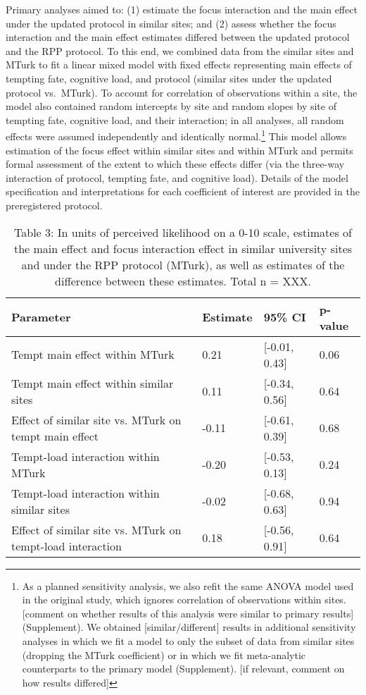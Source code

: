 \documentclass[english,floatsintext,man]{apa6}
\theoremstyle{definition}
\theoremstyle{definition}
\theoremstyle{definition}
\theoremstyle{remark}
\begin{document}
Primary analyses aimed to: (1) estimate the focus interaction and the
main effect under the updated protocol in similar sites; and (2) assess
whether the focus interaction and the main effect estimates differed
between the updated protocol and the RPP protocol. To this end, we
combined data from the similar sites and MTurk to fit a linear mixed
model with fixed effects representing main effects of tempting fate,
cognitive load, and protocol (similar sites under the updated protocol
vs.~MTurk). To account for correlation of observations within a site,
the model also contained random intercepts by site and random slopes by
site of tempting fate, cognitive load, and their interaction; in all
analyses, all random effects were assumed independently and identically
normal.\footnote{As a planned sensitivity analysis, we also refit the
  same ANOVA model used in the original study, which ignores correlation
  of observations within sites. {[}comment on whether results of this
  analysis were similar to primary results{]} (Supplement). We obtained
  {[}similar/different{]} results in additional sensitivity analyses in
  which we fit a model to only the subset of data from similar sites
  (dropping the MTurk coefficient) or in which we fit meta-analytic
  counterparts to the primary model (Supplement). {[}if relevant,
  comment on how results differed{]}} This model allows estimation of
the focus effect within similar sites and within MTurk and permits
formal assessment of the extent to which these effects differ (via the
three-way interaction of protocol, tempting fate, and cognitive load).
Details of the model specification and interpretations for each
coefficient of interest are provided in the preregistered protocol.

\begin{table}[tbp]
\begin{center}
\begin{threeparttable}
\caption{\label{tab:unnamed-chunk-2}Table 3: In units of perceived likelihood on a 0-10 scale, estimates of the main effect and focus interaction effect in similar university sites and under the RPP protocol (MTurk), as well as estimates of the difference between these estimates. Total n = XXX.}
\begin{tabular}{llll}
\toprule
Parameter & Estimate & 95\% CI & p-value\\
\midrule
Tempt main effect within MTurk & 0.21 & [-0.01, 0.43] & 0.06\\
Tempt main effect within similar sites & 0.11 & [-0.34, 0.56] & 0.64\\
Effect of similar site vs. MTurk on tempt main effect & -0.11 & [-0.61, 0.39] & 0.68\\
Tempt-load interaction within MTurk & -0.20 & [-0.53, 0.13] & 0.24\\
Tempt-load interaction within similar sites & -0.02 & [-0.68, 0.63] & 0.94\\
Effect of similar site vs. MTurk on tempt-load interaction & 0.18 & [-0.56, 0.91] & 0.64\\
\bottomrule
\end{tabular}
\end{threeparttable}
\end{center}
\end{table}
\end{document}
